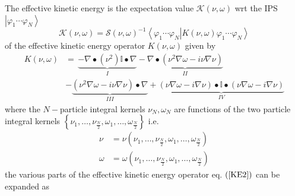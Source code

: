 \documentclass[aps,preprint]{revtex4}%
\begin{document}
The effective kinetic energy is the expectation value $\mathcal{K}\left(
\nu,\omega\right)  $ wrt the IPS\ $\left\vert \varphi_{1}\cdots\varphi
_{N}\right\rangle $
\begin{equation}
\mathcal{K}\left(  \nu,\omega\right)  =\mathcal{S}\left(  \nu,\omega\right)
^{-1}\left\langle \varphi_{1}\cdots\varphi_{N}\right\vert \left.  K\left(
\nu,\omega\right)  \varphi_{1}\cdots\varphi_{N}\right\rangle
\end{equation}
of the effective kinetic energy operator $K\left(  \nu,\omega\right)  $ given
by%
\begin{align}
K\left(  \nu,\omega\right)   &  =\,\underset{I}{\underbrace{-\nabla
\bullet\left(  \nu^{2}\right)  \mathbb{I}\bullet\nabla}}-\underset
{II}{\underbrace{\nabla\bullet\left(  \nu^{2}\nabla\omega-i\nu\nabla
\nu\right)  }}\nonumber\\
&  -\underset{III}{\underbrace{\left(  \nu^{2}\nabla\omega-i\nu\nabla
\nu\right)  \bullet\nabla}}+\underset{IV}{\underbrace{\left(  \nu\nabla
\omega-i\nabla\nu\right)  \bullet\mathbb{I}\bullet\left(  \nu\nabla
\omega-i\nabla\nu\right)  }} \label{KE2}%
\end{align}
where the $N-$particle integral kernels $\nu_{N},\omega_{N}$ are functions of
the two particle integral kernels $\left\{  \nu_{1},\ldots,\nu_{\frac{N}{2}%
},\omega_{1},\ldots,\omega_{\frac{N}{2}}\right\}  $ i.e.%
\begin{align}
\nu &  =\nu\left(  \nu_{1},\ldots,\nu_{\frac{N}{2}},\omega_{1},\ldots
,\omega_{\frac{N}{2}}\right) \nonumber\\
\omega &  =\omega\left(  \nu_{1},\ldots,\nu_{\frac{N}{2}},\omega_{1}%
,\ldots,\omega_{\frac{N}{2}}\right)
\end{align}
the various parts of the effective kinetic energy operator eq. $\left(
\ref{KE2}\right)  $ can be expanded as
\end{document}
